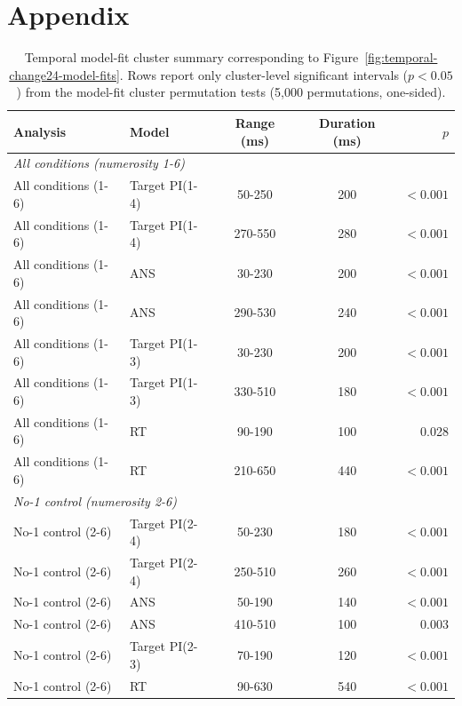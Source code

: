 \appendix
\section*{Appendix}

\begin{table}[!t]
  \centering
  \caption{Temporal model-fit cluster summary corresponding to
  Figure~\ref{fig:temporal-change24-model-fits}. Rows report only
  cluster-level significant intervals ($p < 0.05$) from the model-fit
  cluster permutation tests (5,000 permutations, one-sided).}
  \label{tab:appendix-temporal-model-fit-clusters}
  \small
  \begin{tabular}{@{}llccr@{}}
    \toprule
    Analysis & Model & Range (ms) & Duration (ms) & $p$ \\
    \midrule
    \multicolumn{5}{l}{\textit{All conditions (numerosity 1-6)}} \\
    All conditions (1-6) & Target PI(1-4) & 50-250 & 200 & $<0.001$ \\
    All conditions (1-6) & Target PI(1-4) & 270-550 & 280 & $<0.001$ \\
    All conditions (1-6) & ANS & 30-230 & 200 & $<0.001$ \\
    All conditions (1-6) & ANS & 290-530 & 240 & $<0.001$ \\
    All conditions (1-6) & Target PI(1-3) & 30-230 & 200 & $<0.001$ \\
    All conditions (1-6) & Target PI(1-3) & 330-510 & 180 & $<0.001$ \\
    All conditions (1-6) & RT & 90-190 & 100 & 0.028 \\
    All conditions (1-6) & RT & 210-650 & 440 & $<0.001$ \\
    \midrule
    \multicolumn{5}{l}{\textit{No-1 control (numerosity 2-6)}} \\
    No-1 control (2-6) & Target PI(2-4) & 50-230 & 180 & $<0.001$ \\
    No-1 control (2-6) & Target PI(2-4) & 250-510 & 260 & $<0.001$ \\
    No-1 control (2-6) & ANS & 50-190 & 140 & $<0.001$ \\
    No-1 control (2-6) & ANS & 410-510 & 100 & 0.003 \\
    No-1 control (2-6) & Target PI(2-3) & 70-190 & 120 & $<0.001$ \\
    No-1 control (2-6) & RT & 90-630 & 540 & $<0.001$ \\
    \bottomrule
  \end{tabular}
\end{table}
